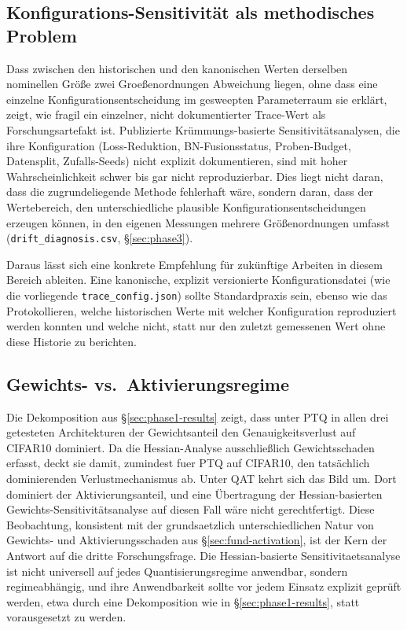 \subsection{Konfigurations-Sensitivität als methodisches Problem}
\label{sec:disc-config}

Dass zwischen den historischen und den kanonischen Werten derselben nominellen Größe zwei Groeßenordnungen Abweichung liegen, ohne dass eine einzelne Konfigurationsentscheidung im gesweepten Parameterraum sie erklärt, zeigt, wie fragil ein einzelner, nicht dokumentierter Trace-Wert als Forschungsartefakt ist. Publizierte Krümmungs-basierte Sensitivitätsanalysen, die ihre Konfiguration (Loss-Reduktion, BN-Fusionsstatus, Proben-Budget, Datensplit, Zufalls-Seeds) nicht explizit dokumentieren, sind mit hoher Wahrscheinlichkeit schwer bis gar nicht reproduzierbar. Dies liegt nicht daran, dass die zugrundeliegende Methode fehlerhaft wäre, sondern daran, dass der Wertebereich, den unterschiedliche plausible Konfigurationsentscheidungen erzeugen können, in den eigenen Messungen mehrere Größenordnungen umfasst (\texttt{drift\_diagnosis.csv}, \S\ref{sec:phase3}).
\par\medskip

Daraus lässt sich eine konkrete Empfehlung für zukünftige Arbeiten in diesem Bereich ableiten. Eine kanonische, explizit versionierte Konfigurationsdatei (wie die vorliegende \texttt{trace\_config.json}) sollte Standardpraxis sein, ebenso wie das Protokollieren, welche historischen Werte mit welcher Konfiguration reproduziert werden konnten und welche nicht, statt nur den zuletzt gemessenen Wert ohne diese Historie zu berichten.

\subsection{Gewichts- vs.\ Aktivierungsregime}
\label{sec:disc-regime}

Die Dekomposition aus \S\ref{sec:phase1-results} zeigt, dass unter PTQ in allen drei getesteten Architekturen der Gewichtsanteil den Genauigkeitsverlust auf CIFAR10 dominiert. Da die Hessian-Analyse ausschließlich Gewichtsschaden erfasst, deckt sie damit, zumindest fuer PTQ auf CIFAR10, den tatsächlich dominierenden Verlustmechanismus ab. Unter QAT kehrt sich das Bild um. Dort dominiert der Aktivierungsanteil, und eine Übertragung der Hessian-basierten Gewichts-Sensitivitätsanalyse auf diesen Fall wäre nicht gerechtfertigt. Diese Beobachtung, konsistent mit der grundsaetzlich unterschiedlichen Natur von Gewichts- und Aktivierungsschaden aus \S\ref{sec:fund-activation}, ist der Kern der Antwort auf die dritte Forschungsfrage. Die Hessian-basierte Sensitivitaetsanalyse ist nicht universell auf jedes Quantisierungsregime anwendbar, sondern regimeabhängig, und ihre Anwendbarkeit sollte vor jedem Einsatz explizit geprüft werden, etwa durch eine Dekomposition wie in \S\ref{sec:phase1-results}, statt vorausgesetzt zu werden.

